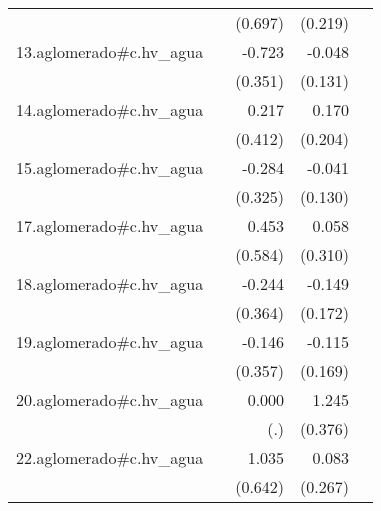 {\begin{longtable}{l*{4}{D{.}{.}{-1}}}
            &                     &     (0.697)         &     (0.219)         &                     \\
\addlinespace
13.aglomerado#c.hv\_agua&                     &      -0.723\sym{*}  &      -0.048         &                     \\
            &                     &     (0.351)         &     (0.131)         &                     \\
\addlinespace
14.aglomerado#c.hv\_agua&                     &       0.217         &       0.170         &                     \\
            &                     &     (0.412)         &     (0.204)         &                     \\
\addlinespace
15.aglomerado#c.hv\_agua&                     &      -0.284         &      -0.041         &                     \\
            &                     &     (0.325)         &     (0.130)         &                     \\
\addlinespace
17.aglomerado#c.hv\_agua&                     &       0.453         &       0.058         &                     \\
            &                     &     (0.584)         &     (0.310)         &                     \\
\addlinespace
18.aglomerado#c.hv\_agua&                     &      -0.244         &      -0.149         &                     \\
            &                     &     (0.364)         &     (0.172)         &                     \\
\addlinespace
19.aglomerado#c.hv\_agua&                     &      -0.146         &      -0.115         &                     \\
            &                     &     (0.357)         &     (0.169)         &                     \\
\addlinespace
20.aglomerado#c.hv\_agua&                     &       0.000         &       1.245\sym{***}&                     \\
            &                     &         (.)         &     (0.376)         &                     \\
\addlinespace
22.aglomerado#c.hv\_agua&                     &       1.035         &       0.083         &                     \\
            &                     &     (0.642)         &     (0.267)         &                     \\

\end{longtable}}
